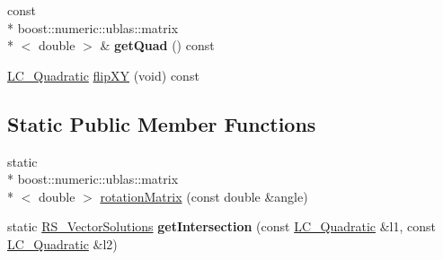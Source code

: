 \begin{DoxyCompactItemize}
\item 
\hypertarget{classLC__Quadratic_a147a5d9bcba278e48be51e66ecf9a176}{const \\*
boost\-::numeric\-::ublas\-::matrix\\*
$<$ double $>$ \& {\bfseries get\-Quad} () const }\label{classLC__Quadratic_a147a5d9bcba278e48be51e66ecf9a176}

\item 
\hyperlink{classLC__Quadratic}{L\-C\-\_\-\-Quadratic} \hyperlink{classLC__Quadratic_a7ceb41f57a3c9730114d2aee1747a50c}{flip\-X\-Y} (void) const 
\end{DoxyCompactItemize}
\subsection*{Static Public Member Functions}
\begin{DoxyCompactItemize}
\item 
static \\*
boost\-::numeric\-::ublas\-::matrix\\*
$<$ double $>$ \hyperlink{classLC__Quadratic_ae6ab500bc3b88cb26ce895db2d3831bf}{rotation\-Matrix} (const double \&angle)
\item 
\hypertarget{classLC__Quadratic_aecae7611b20be111cf3685a3730fdec7}{static \hyperlink{classRS__VectorSolutions}{R\-S\-\_\-\-Vector\-Solutions} {\bfseries get\-Intersection} (const \hyperlink{classLC__Quadratic}{L\-C\-\_\-\-Quadratic} \&l1, const \hyperlink{classLC__Quadratic}{L\-C\-\_\-\-Quadratic} \&l2)}\label{classLC__Quadratic_aecae7611b20be111cf3685a3730fdec7}

\end{DoxyCompactItemize}

